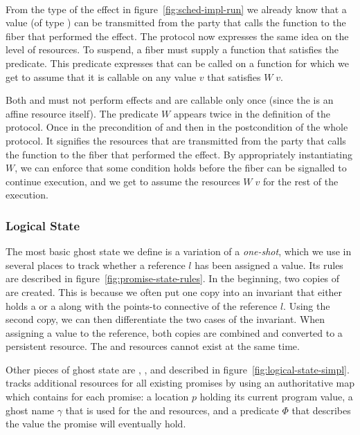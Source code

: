 \paragraph*{\esuspend{}}
From the type of the \esuspend{} effect in figure~\ref{fig:sched-impl-run} we already know that a value (of type ) can be transmitted from the party that calls the  function to the fiber that performed the effect.
The \esuspend{} protocol now expresses the same idea on the level of resources.
To suspend, a fiber must supply a function  that satisfies the \gsIsReg{} predicate.
This predicate expresses that  can be called on a  function for which we get to assume that it is callable on any value \(v\) that satisfies \(W\; v\).

Both  and  must not perform effects and are callable only once (since the \ewpt{} is an affine resource itself).
The predicate \(W\) appears twice in the definition of the protocol.
Once in the precondition of  and then in the postcondition of the whole protocol.
It signifies the resources that are transmitted from the party that calls the  function to the fiber that performed the effect.
By appropriately instantiating \(W\), we can enforce that some condition holds before the fiber can be signalled to continue execution, and we get to assume the resources \(W\; v\) for the rest of the execution.

\subsubsection{Logical State}
\label{sec:sched-spec-state}

The most basic ghost state we define is a variation of a \emph{one-shot}, which we use in several places to track whether a reference \(l\) has been assigned a value.
Its rules are described in figure~\ref{fig:promise-state-rules}.
In the beginning, two copies of \gspwait{\gamma} are created.
This is because we often put one copy into an invariant that either holds a \gspwait{\gamma} or a \gspdone{\gamma} along with the points-to connective of the reference \(l\).
Using the second copy, we can then differentiate the two cases of the invariant.
When assigning a value to the reference, both copies are combined and converted to a persistent \gspdone{} resource.
The \gspwait{} and \gspdone{} resources cannot exist at the same time.

Other pieces of ghost state are \gsPInvIn{}, \gsIsPr{}, and \gsReady{} described in figure~\ref{fig:logical-state-simpl}.
\gsPInvIn{} tracks additional resources for all existing promises by using an authoritative map which contains for each promise:
a location \(p\) holding its current program value,
a ghost name \(\gamma\) that is used for the \gspwait{} and \gspdone{} resources,
and a predicate \(Φ\) that describes the value the promise will eventually hold.

